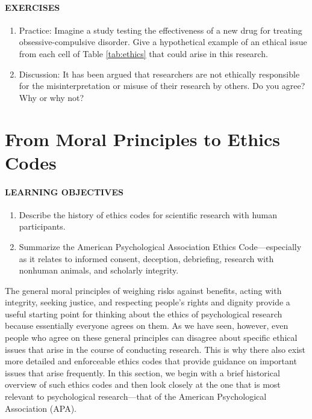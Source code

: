 \documentclass[
]{krantz}
\providecommand{\tightlist}{%
  \setlength{\itemsep}{0pt}\setlength{\parskip}{0pt}}
\begin{document}
\hypertarget{exercises-7}{%
\paragraph*{EXERCISES}\label{exercises-7}}

\begin{enumerate}
\def\labelenumi{\arabic{enumi}.}
\tightlist
\item
  Practice: Imagine a study testing the effectiveness of a new drug for treating obsessive-compulsive disorder. Give a hypothetical example of an ethical issue from each cell of Table \ref{tab:ethics} that could arise in this research.
\item
  Discussion: It has been argued that researchers are not ethically responsible for the misinterpretation or misuse of their research by others. Do you agree? Why or why not?
\end{enumerate}

\hypertarget{from-moral-principles-to-ethics-codes}{%
\section{From Moral Principles to Ethics Codes}\label{from-moral-principles-to-ethics-codes}}

\hypertarget{learning-objectives-10}{%
\paragraph*{LEARNING OBJECTIVES}\label{learning-objectives-10}}

\begin{enumerate}
\def\labelenumi{\arabic{enumi}.}
\tightlist
\item
  Describe the history of ethics codes for scientific research with human participants.
\item
  Summarize the American Psychological Association Ethics Code---especially as it relates to informed consent, deception, debriefing, research with nonhuman animals, and scholarly integrity.
\end{enumerate}

The general moral principles of weighing risks against benefits, acting with integrity, seeking justice, and respecting people's rights and dignity provide a useful starting point for thinking about the ethics of psychological research because essentially everyone agrees on them. As we have seen, however, even people who agree on these general principles can disagree about specific ethical issues that arise in the course of conducting research. This is why there also exist more detailed and enforceable ethics codes that provide guidance on important issues that arise frequently. In this section, we begin with a brief historical overview of such ethics codes and then look closely at the one that is most relevant to psychological research---that of the American Psychological Association (APA).
\end{document}
